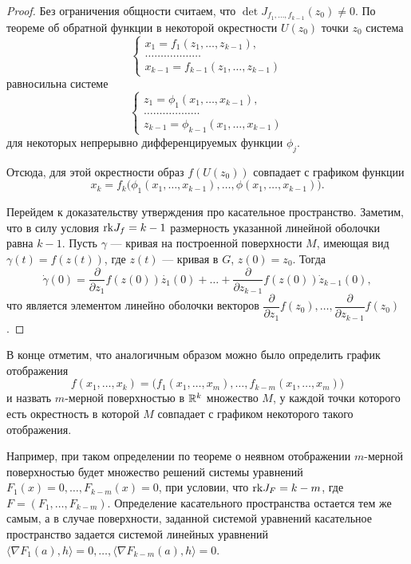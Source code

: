 \documentclass[a4paper]{article}
\theoremstyle{named}
\begin{document}
    \begin{proof}
        Без ограничения общности считаем, что $\det J_{f_1,\ldots, f_{k-1}}(z_0)\ne 0$.
        По теореме об обратной функции в некоторой окрестности $U(z_0)$ точки $z_0$	система
        $$
            \begin{cases}
                x_1=f_1(z_1,\ldots, z_{k-1}),\\
                \ldots\ldots\ldots\ldots\ldots\ldots\\
                x_{k-1}=f_{k-1}(z_1,\ldots, z_{k-1})
            \end{cases}
        $$
        равносильна системе
        $$
            \begin{cases}
                z_1=\phi_1(x_1,\ldots, x_{k-1}),\\
                \ldots\ldots\ldots\ldots\ldots\ldots\\
                z_{k-1}=\phi_{k-1}(x_1,\ldots, x_{k-1})
            \end{cases}
        $$
        для некоторых непрерывно дифференцируемых функции $\phi_j$.
    
        Отсюда, для этой окрестности образ $f(U(z_0))$ совпадает с графиком функции
        $$x_k = f_k\bigl(\phi_1(x_1,\ldots, x_{k-1}),\ldots, \phi(x_1,\ldots, x_{k-1})\bigr).$$
    
        Перейдем к доказательству утверждения про касательное пространство.
        Заметим, что в силу условия ${\rm rk}J_f = k-1$ размерность указанной линейной оболочки равна $k-1$.
        Пусть $\gamma$ --- кривая на построенной поверхности $M$, имеющая вид $\gamma(t)= f(z(t))$, где $z(t)$ --- кривая в $G$, $z(0) = z_0$.
        Тогда
        $$
            \dot{\gamma}(0)	= \dfrac{\partial}{\partial z_1}f(z(0))\dot{z_1}(0) + \ldots +
            \dfrac{\partial}{\partial z_{k-1}}f(z(0))\dot{z}_{k-1}(0),
        $$
        что является элементом линейно оболочки векторов $\dfrac{\partial}{\partial z_1}f(z_0),\ldots, \dfrac{\partial}{\partial z_{k-1}}f(z_0)$.
    \end{proof}
    
    В конце отметим, что аналогичным образом можно было определить график отображения $$f(x_1,\ldots,x_k) = \bigl(f_1(x_1,\ldots, x_m),\ldots, f_{k-m}(x_1,\ldots, x_m)\bigr)$$ и назвать $m$-мерной поверхностью в $\mathbb{R}^k$ множество $M$, у каждой точки которого есть окрестность в которой $M$ совпадает с графиком некоторого такого отображения.
    
    Например, при таком определении по теореме о неявном отображении $m$-мерной поверхностью будет множество решений системы уравнений $F_1(x)=0,\ldots, F_{k-m}(x)=0$, при условии, что ${\rm rk}J_F=k-m$, где $F=(F_1,\ldots, F_{k-m})$.
    Определение касательного пространства остается тем же самым, а в случае поверхности, заданной системой уравнений касательное пространство задается системой линейных уравнений $\langle\nabla F_1(a), h\rangle=0,\ldots, \langle\nabla F_{k-m}(a), h\rangle=0$.
\end{document}
